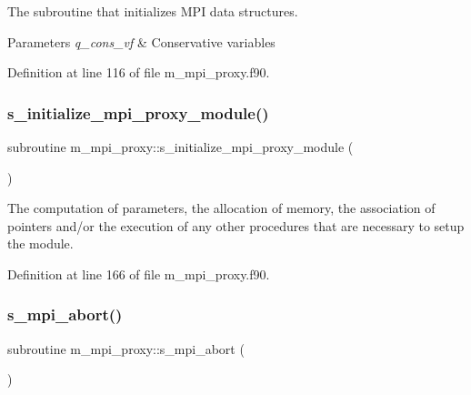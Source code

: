 The subroutine that initializes M\+PI data structures. 


\begin{DoxyParams}{Parameters}
{\em q\+\_\+cons\+\_\+vf} & Conservative variables \\
\hline
\end{DoxyParams}


Definition at line 116 of file m\+\_\+mpi\+\_\+proxy.\+f90.

\mbox{\label{namespacem__mpi__proxy_a015ee2c0892e9cfcb858da8f27b646d5}} 
\subsubsection{\texorpdfstring{s\+\_\+initialize\+\_\+mpi\+\_\+proxy\+\_\+module()}{s\_initialize\_mpi\_proxy\_module()}}
{\footnotesize\ttfamily subroutine m\+\_\+mpi\+\_\+proxy\+::s\+\_\+initialize\+\_\+mpi\+\_\+proxy\+\_\+module (\begin{DoxyParamCaption}{ }\end{DoxyParamCaption})}



The computation of parameters, the allocation of memory, the association of pointers and/or the execution of any other procedures that are necessary to setup the module. 



Definition at line 166 of file m\+\_\+mpi\+\_\+proxy.\+f90.

\mbox{\label{namespacem__mpi__proxy_a04ac565bad2b22dc045a5eeb4f516e2e}} 
\subsubsection{\texorpdfstring{s\+\_\+mpi\+\_\+abort()}{s\_mpi\_abort()}}
{\footnotesize\ttfamily subroutine m\+\_\+mpi\+\_\+proxy\+::s\+\_\+mpi\+\_\+abort (\begin{DoxyParamCaption}{ }\end{DoxyParamCaption})}



